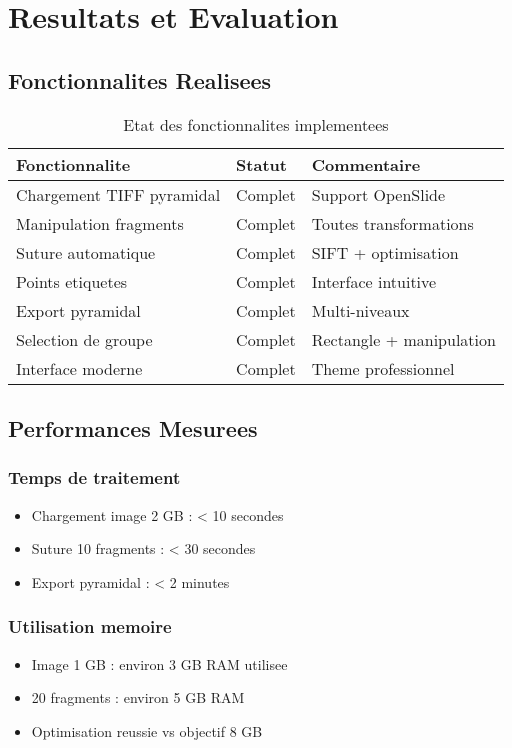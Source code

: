 \documentclass[12pt,a4paper]{article}
\begin{document}
\section{Resultats et Evaluation}

\subsection{Fonctionnalites Realisees}

\begin{table}[h]
\centering
\begin{tabular}{|p{4cm}|p{2cm}|p{6cm}|}
\hline
\textbf{Fonctionnalite} & \textbf{Statut} & \textbf{Commentaire} \\
\hline
Chargement TIFF pyramidal & Complet & Support OpenSlide \\
\hline
Manipulation fragments & Complet & Toutes transformations \\
\hline
Suture automatique & Complet & SIFT + optimisation \\
\hline
Points etiquetes & Complet & Interface intuitive \\
\hline
Export pyramidal & Complet & Multi-niveaux \\
\hline
Selection de groupe & Complet & Rectangle + manipulation \\
\hline
Interface moderne & Complet & Theme professionnel \\
\hline
\end{tabular}
\caption{Etat des fonctionnalites implementees}
\end{table}

\subsection{Performances Mesurees}

\subsubsection{Temps de traitement}
\begin{itemize}
\item Chargement image 2 GB : < 10 secondes
\item Suture 10 fragments : < 30 secondes
\item Export pyramidal : < 2 minutes
\end{itemize}

\subsubsection{Utilisation memoire}
\begin{itemize}
\item Image 1 GB : environ 3 GB RAM utilisee
\item 20 fragments : environ 5 GB RAM
\item Optimisation reussie vs objectif 8 GB
\end{itemize}
\end{document}
